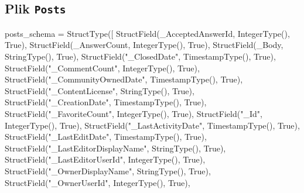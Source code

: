 \documentclass[
  letterpaper,
  DIV=11,
  numbers=noendperiod]{scrreprt}
\newenvironment{Shaded}{\begin{snugshade}}{\end{snugshade}}
\newcommand{\NormalTok}[1]{\textcolor[rgb]{0.00,0.23,0.31}{#1}}
\newcommand{\OperatorTok}[1]{\textcolor[rgb]{0.37,0.37,0.37}{#1}}
\newcommand{\StringTok}[1]{\textcolor[rgb]{0.13,0.47,0.30}{#1}}
\newcommand{\VariableTok}[1]{\textcolor[rgb]{0.07,0.07,0.07}{#1}}
\begin{document}
\normalsize

\hypertarget{plik-posts}{%
\subsection{\texorpdfstring{Plik
\texttt{Posts}}{Plik Posts}}\label{plik-posts}}

\small

\begin{Shaded}
\begin{Highlighting}[]
\NormalTok{posts\_schema }\OperatorTok{=}\NormalTok{ StructType([}
\NormalTok{    StructField(}\StringTok{\textquotesingle{}\_AcceptedAnswerId\textquotesingle{}}\NormalTok{, IntegerType(), }\VariableTok{True}\NormalTok{),}
\NormalTok{    StructField(}\StringTok{\textquotesingle{}\_AnswerCount\textquotesingle{}}\NormalTok{, IntegerType(), }\VariableTok{True}\NormalTok{),}
\NormalTok{    StructField(}\StringTok{\textquotesingle{}\_Body\textquotesingle{}}\NormalTok{, StringType(), }\VariableTok{True}\NormalTok{),}
\NormalTok{    StructField(}\StringTok{"\_ClosedDate"}\NormalTok{, TimestampType(), }\VariableTok{True}\NormalTok{),}
\NormalTok{    StructField(}\StringTok{"\_CommentCount"}\NormalTok{, IntegerType(), }\VariableTok{True}\NormalTok{),}
\NormalTok{    StructField(}\StringTok{"\_CommunityOwnedDate"}\NormalTok{, TimestampType(), }\VariableTok{True}\NormalTok{),}
\NormalTok{    StructField(}\StringTok{"\_ContentLicense"}\NormalTok{, StringType(), }\VariableTok{True}\NormalTok{),}
\NormalTok{    StructField(}\StringTok{"\_CreationDate"}\NormalTok{, TimestampType(), }\VariableTok{True}\NormalTok{),}
\NormalTok{    StructField(}\StringTok{"\_FavoriteCount"}\NormalTok{, IntegerType(), }\VariableTok{True}\NormalTok{),}
\NormalTok{    StructField(}\StringTok{"\_Id"}\NormalTok{, IntegerType(), }\VariableTok{True}\NormalTok{),}
\NormalTok{    StructField(}\StringTok{"\_LastActivityDate"}\NormalTok{, TimestampType(), }\VariableTok{True}\NormalTok{),}
\NormalTok{    StructField(}\StringTok{"\_LastEditDate"}\NormalTok{, TimestampType(), }\VariableTok{True}\NormalTok{),}
\NormalTok{    StructField(}\StringTok{"\_LastEditorDisplayName"}\NormalTok{, StringType(), }\VariableTok{True}\NormalTok{),}
\NormalTok{    StructField(}\StringTok{"\_LastEditorUserId"}\NormalTok{, IntegerType(), }\VariableTok{True}\NormalTok{),}
\NormalTok{    StructField(}\StringTok{"\_OwnerDisplayName"}\NormalTok{, StringType(), }\VariableTok{True}\NormalTok{),}
\NormalTok{    StructField(}\StringTok{"\_OwnerUserId"}\NormalTok{, IntegerType(), }\VariableTok{True}\NormalTok{),}

\end{Highlighting}
\end{Shaded}
\end{document}
